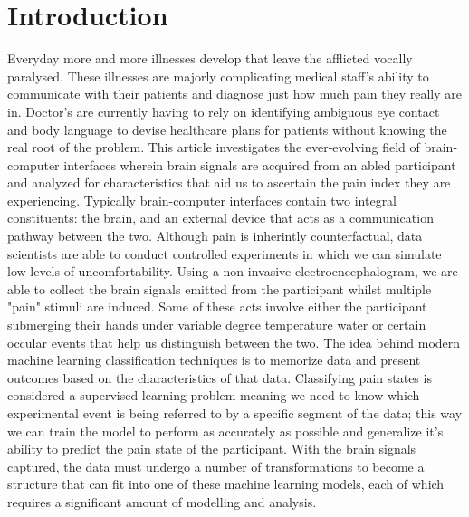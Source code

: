 \documentclass[11pt]{article}
\begin{document}
\clearpage


\tableofcontents

\clearpage


\section{Introduction}

Everyday more and more illnesses develop that leave the afflicted vocally paralysed. These illnesses are majorly complicating medical staff's ability to communicate with their patients and diagnose just how much pain they really are in. Doctor's are currently having to rely on identifying ambiguous eye contact and body language to devise healthcare plans for patients without knowing the real root of the problem. This article investigates the ever-evolving field of brain-computer interfaces wherein brain signals are acquired from an abled participant and analyzed for characteristics that aid us to ascertain the pain index they are experiencing. Typically brain-computer interfaces contain two integral constituents: the brain, and an external device that acts as a communication pathway between the two. Although pain is inherintly counterfactual, data scientists are able to conduct controlled experiments in which we can simulate low levels of uncomfortability. Using a non-invasive electroencephalogram, we are able to collect the brain signals emitted from the participant whilst multiple "pain" stimuli are induced. Some of these acts involve either the participant submerging their hands under variable degree temperature water or certain occular events that help us distinguish between the two. The idea behind modern machine learning classification techniques is to memorize data and present outcomes based on the characteristics of that data. Classifying pain states is considered a supervised learning problem meaning we need to know which experimental event is being referred to by a specific segment of the data; this way we can train the model to perform as accurately as possible and generalize it's ability to predict the pain state of the participant. With the brain signals captured, the data must undergo a number of transformations to become a structure that can fit into one of these machine learning models, each of which requires a significant amount of modelling and analysis. 
\end{document}
